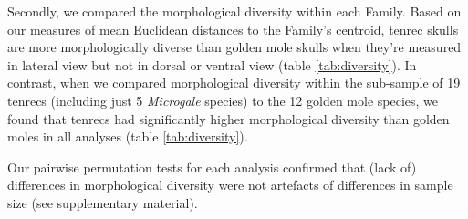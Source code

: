 \documentclass[12pt,a4paper]{article}
\begin{document}

	Secondly, we compared the morphological diversity within each Family. Based on our measures of mean Euclidean distances to the Family's centroid, tenrec skulls are more morphologically diverse than golden mole skulls when they're measured in lateral view but not in dorsal or ventral view (table \ref{tab:diversity}). In contrast, when we compared morphological diversity within the sub-sample of 19 tenrecs (including just 5 \textit{Microgale} species) to the 12 golden mole species, we found that tenrecs had significantly higher morphological diversity than golden moles in all analyses (table \ref{tab:diversity}).

	Our pairwise permutation tests for each analysis confirmed that (lack of) differences in morphological diversity were not artefacts of differences in sample size (see supplementary material).

	\begin{table}[h]			
	\caption[Comparison of morphological diversity in tenrecs and golden moles.]
	 
	\label{tab:diversity}  
	\end{table}
\end{document}

